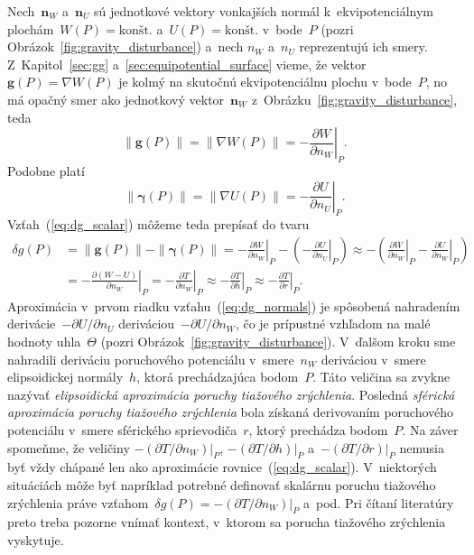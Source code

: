 \documentclass[a4paper,12pt]{book}
\let\vec\mathbf
\begin{document}
Nech~$\vec n_W$ a~$\vec n_U$ sú jednotkové vektory vonkajších normál 
k~ekvipotenciálnym plochám~$W(P) = \textrm{konšt.}$ a~$U(P) = \textrm{konšt.}$ 
v~bode~$P$ (pozri Obrázok~\ref{fig:gravity_disturbance}) a~nech $n_W$ a~$n_U$ 
reprezentujú ich smery.  Z~Kapitol~\ref{sec:gg} 
a~\ref{sec:equipotential_surface} vieme, že vektor~$\vec g(P) = \nabla W(P)$ je 
kolmý na skutočnú ekvipotenciálnu plochu v~bode~$P$, no má opačný smer ako 
jednotkový vektor~$\vec n_W$ z~Obrázku~\ref{fig:gravity_disturbance}, teda
%
\begin{equation}
\| \vec g(P) \| = \| \nabla W(P) \| = -\left.\frac{\partial W}{\partial 
n_W}\right|_P.
\end{equation}
%
Podobne platí
%
\begin{equation}
\| \boldsymbol \gamma(P) \| = \| \nabla U(P) \| = -\left.\frac{\partial 
U}{\partial n_U}\right|_P.
\end{equation}
%
Vzťah~(\ref{eq:dg_scalar}) môžeme teda prepísať do tvaru
%
\begin{equation}
\label{eq:dg_normals}
\begin{split}
\delta g(P) &= \| \vec g(P) \| - \| \boldsymbol\gamma(P) \| 
= -\left.\frac{\partial W}{\partial n_W}\right|_P - \left( 
- \left.\frac{\partial U}{\partial n_U}\right|_P\right) \approx -\left( 
\left.\frac{\partial W}{\partial n_W}\right|_P - \left.\frac{\partial 
U}{\partial n_W}\right|_P\right)\\
%
&= -\left.\frac{\partial (W - U)}{\partial n_W}\right|_P 
=  -\left.\frac{\partial T}{\partial n_W}\right|_P \approx 
-\left.\frac{\partial T}{\partial h}\right|_P \approx -\left.\frac{\partial 
T}{\partial r}\right|_P{.}
\end{split}
\end{equation}
%
Aproximácia v~prvom riadku vzťahu~(\ref{eq:dg_normals}) je spôsobená nahradením 
derivácie~$-\partial U \slash \partial n_U$ deriváciou~$-\partial U \slash 
\partial n_W$, čo je prípustné vzhľadom na malé hodnoty uhla~$\Theta$ (pozri 
Obrázok~\ref{fig:gravity_disturbance}).  V~ďalšom kroku sme nahradili deriváciu 
poruchového potenciálu v~smere~$n_W$ deriváciou v~smere elipsoidickej 
normály~$h$, ktorá prechádzajúca bodom~$P$.  Táto veličina sa zvykne nazývať 
\emph{elipsoidická aproximácia poruchy tiažového zrýchlenia}.  Posledná 
\emph{sférická aproximácia poruchy tiažového zrýchlenia} bola získaná 
derivovaním poruchového potenciálu v~smere sférického sprievodiča~$r$, ktorý 
prechádza bodom~$P$.  Na záver spomeňme, že veličiny $-\left(\partial T \slash 
\partial n_W\right)|_P$, $-\left(\partial T \slash \partial h\right)|_P$ 
a~$-\left(\partial T \slash \partial r\right)|_P$ nemusia byť vždy chápané len 
ako aproximácie rovnice~(\ref{eq:dg_scalar}).  V~niektorých situáciách môže byť 
napríklad potrebné definovať skalárnu poruchu tiažového zrýchlenia práve 
vzťahom~$\delta g(P) = -\left(\partial T \slash \partial n_W\right)|_P$ a~pod.  
Pri čítaní literatúry preto treba pozorne vnímať kontext, v~ktorom sa porucha 
tiažového zrýchlenia vyskytuje.
\end{document}

